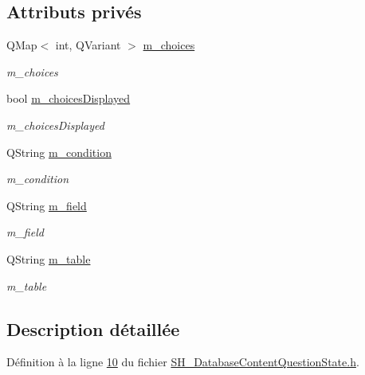 \subsection*{Attributs privés}
\begin{DoxyCompactItemize}
\item 
Q\-Map$<$ int, Q\-Variant $>$ \hyperlink{classSH__DatabaseContentQuestionState_a0bbbd0d3b22877dc9e78f81136f31618}{m\-\_\-choices}
\begin{DoxyCompactList}\small\item\em m\-\_\-choices \end{DoxyCompactList}\item 
bool \hyperlink{classSH__DatabaseContentQuestionState_aff4d8f402d9299029038ec4f21271b2b}{m\-\_\-choices\-Displayed}
\begin{DoxyCompactList}\small\item\em m\-\_\-choices\-Displayed \end{DoxyCompactList}\item 
Q\-String \hyperlink{classSH__DatabaseContentQuestionState_aaffd467fccc69b6d46194f04831a1edc}{m\-\_\-condition}
\begin{DoxyCompactList}\small\item\em m\-\_\-condition \end{DoxyCompactList}\item 
Q\-String \hyperlink{classSH__DatabaseContentQuestionState_a32b3f4f2cadbc4837add2556c1a926d4}{m\-\_\-field}
\begin{DoxyCompactList}\small\item\em m\-\_\-field \end{DoxyCompactList}\item 
Q\-String \hyperlink{classSH__DatabaseContentQuestionState_a95d8a6ffc051cd9283314a56f7a11296}{m\-\_\-table}
\begin{DoxyCompactList}\small\item\em m\-\_\-table \end{DoxyCompactList}\end{DoxyCompactItemize}


\subsection{Description détaillée}


Définition à la ligne \hyperlink{SH__DatabaseContentQuestionState_8h_source_l00010}{10} du fichier \hyperlink{SH__DatabaseContentQuestionState_8h_source}{S\-H\-\_\-\-Database\-Content\-Question\-State.\-h}.




